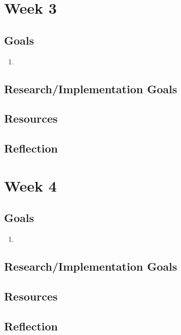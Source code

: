 \documentclass[conference]{IEEEtran}
\begin{document}
\section*{Week 3}

\subsection{Goals}
\begin{enumerate}
\item 
\end{enumerate}

\subsection{Research/Implementation Goals}

\subsection{Resources}

\subsection{Reflection}


\section*{Week 4}

\subsection{Goals}
\begin{enumerate}
\item 
\end{enumerate}

\subsection{Research/Implementation Goals}

\subsection{Resources}

\subsection{Reflection}




\end{document}
